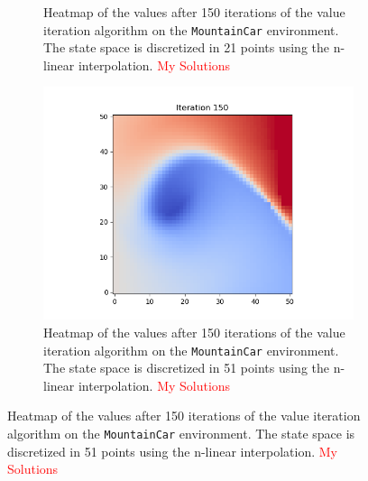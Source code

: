 \documentclass{article}
\begin{document}
\begin{enumerate}[(a)]
\begin{figure}[h!]
\begin{subfigure}{0.3\textwidth}
\caption{Heatmap of the values after 150 iterations of the value iteration algorithm on the \texttt{MountainCar} environment. 
                The state space is discretized in 21 points using the n-linear interpolation. \textcolor{red}{My Solutions}}
    \end{subfigure}
    \hspace{0.1 in}
    \begin{subfigure}{0.3\textwidth}
        \centering
        \includegraphics[width=\textwidth]{figures/part_2_b_mountain-car_s-51.png}
\caption{Heatmap of the values after 150 iterations of the value iteration algorithm on the \texttt{MountainCar} environment. 
                The state space is discretized in 51 points using the n-linear interpolation. \textcolor{red}{My Solutions}}
                

\end{subfigure}
\end{figure}
\end{enumerate}
\end{document}
